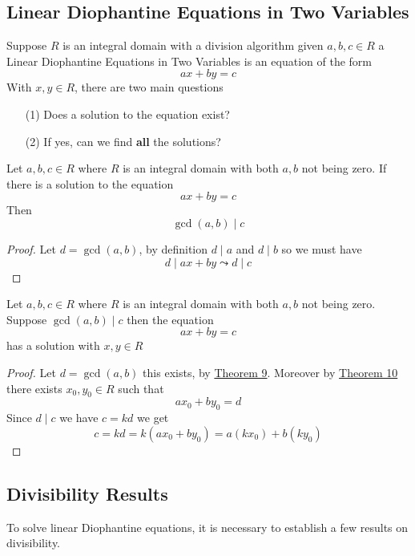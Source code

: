 \documentclass[16pt,a4paper]{article}
\theoremstyle{definition}
\begin{document}
\subsection{Linear Diophantine Equations in Two Variables}
Suppose $R$ is an integral domain with a division algorithm given $a,b,c\in R$ a  Linear Diophantine Equations in Two Variables is an equation of the form 
\[ax+by = c\]
With $x,y \in R$, there are two main questions
\begin{itemize}
\item[(1)] Does a solution to the equation exist?
\item[(2)] If yes, can we find \textbf{all} the solutions?
\end{itemize} 
\begin{thm}{}{}
Let $a,b,c\in R$ where $R$ is an integral domain with both $a,b$ not being zero. If there is a solution to the equation 
\[ax+by = c\]
Then 
\[\gcd(a,b)\mid c\] 
\end{thm}
\begin{proof}
Let $d=\gcd(a,b)$, by definition $d\mid a$ and $d\mid b$ so we must have 
\[d\mid ax+by \leadsto d\mid c\]
\end{proof}

\begin{thm}{}{}
Let $a,b,c\in R$ where $R$ is an integral domain with both $a,b$ not being zero. Suppose $\gcd(a,b)\mid c$ then the equation 
\[ax+by = c\]
has a solution with $x,y\in R$
\end{thm}
\begin{proof}
Let $d=\gcd(a,b)$ this exists, by \hyperref[thm9]{Theorem 9}. Moreover by \hyperref[thm10]{Theorem 10} there exists $x_0,y_0 \in R$ such that
\[ax_0 + by_0 = d\]
Since $d\mid c$ we have $c=kd$ we get 
\[c=kd = k(ax_0 + by_0) = a(kx_0)+b(ky_0)\]
\end{proof}
\subsection{Divisibility Results}
To solve linear Diophantine equations, it is necessary to establish a few results on divisibility.
\end{document}
